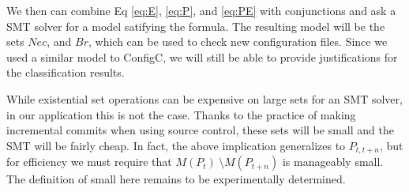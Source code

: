 We then can combine Eq \ref{eq:E}, \ref{eq:P}, and \ref{eq:PE} with conjunctions and ask a SMT solver for a model satifying the formula.
The resulting model will be the sets $Nec$, and $Br$, which can be used to check new configuration files.
Since we used a similar model to ConfigC, we will still be able to provide justifications for the classification results.

While existential set operations can be expensive on large sets for an SMT solver, in our application this is not the case.
Thanks to the practice of making incremental commits when using source control, these sets will be small and the SMT will be fairly cheap.
In fact, the above implication generalizes to $P_{t,t+n}$, but for efficiency we must require that $M(P_{t})\ \setminus M(P_{t+n})$ is manageably small.
The definition of small here remains to be experimentally determined.
